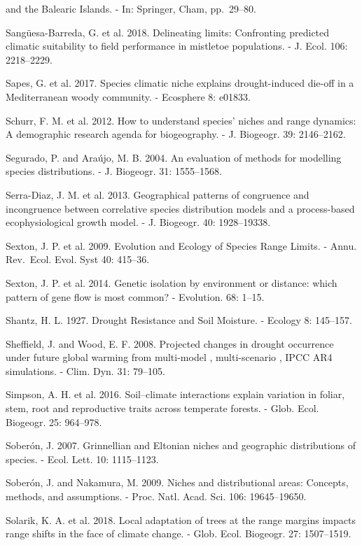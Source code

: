 \documentclass[11pt,twoside]{reedthesis}
\begin{document}
and the Balearic Islands. - In: Springer, Cham, pp.~29--80.\par
Sangüesa-Barreda, G. et al. 2018. Delineating limits: Confronting
predicted climatic suitability to field performance in mistletoe
populations. - J. Ecol. 106: 2218--2229.\par
Sapes, G. et al. 2017. Species climatic niche explains drought-induced
die-off in a Mediterranean woody community. - Ecosphere 8: e01833.\par
Schurr, F. M. et al. 2012. How to understand species' niches and range
dynamics: A demographic research agenda for biogeography. - J. Biogeogr.
39: 2146--2162.\par
Segurado, P. and Araújo, M. B. 2004. An evaluation of methods for
modelling species distributions. - J. Biogeogr. 31: 1555--1568.\par
Serra-Diaz, J. M. et al. 2013. Geographical patterns of congruence and
incongruence between correlative species distribution models and a
process-based ecophysiological growth model. - J. Biogeogr. 40:
1928--19338.\par
Sexton, J. P. et al. 2009. Evolution and Ecology of Species Range
Limits. - Annu. Rev.~Ecol. Evol. Syst 40: 415--36.\par
Sexton, J. P. et al. 2014. Genetic isolation by environment or distance:
which pattern of gene flow is most common? - Evolution. 68: 1--15.\par
Shantz, H. L. 1927. Drought Resistance and Soil Moisture. - Ecology 8:
145--157.\par
Sheffield, J. and Wood, E. F. 2008. Projected changes in drought
occurrence under future global warming from multi-model , multi-scenario
, IPCC AR4 simulations. - Clim. Dyn. 31: 79--105.\par
Simpson, A. H. et al. 2016. Soil--climate interactions explain variation
in foliar, stem, root and reproductive traits across temperate forests.
- Glob. Ecol. Biogeogr. 25: 964--978.\par
Soberón, J. 2007. Grinnellian and Eltonian niches and geographic
distributions of species. - Ecol. Lett. 10: 1115--1123.\par
Soberón, J. and Nakamura, M. 2009. Niches and distributional areas:
Concepts, methods, and assumptions. - Proc. Natl. Acad. Sci. 106:
19645--19650.\par
Solarik, K. A. et al. 2018. Local adaptation of trees at the range
margins impacts range shifts in the face of climate change. - Glob.
Ecol. Biogeogr. 27: 1507--1519.\par
\end{document}
